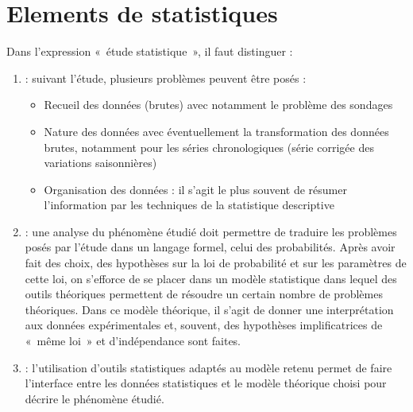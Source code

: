 \documentclass[letterpaper,10pt,french]{sphinxmanual}
\begin{document}
\chapter{Elements de statistiques}
\label{\detokenize{elemstats:elements-de-statistiques}}\label{\detokenize{elemstats::doc}}
\sphinxAtStartPar
Dans l’expression « étude statistique », il faut distinguer :
\begin{enumerate}
%
\item {} 
\sphinxAtStartPar
{} : suivant l’étude, plusieurs problèmes peuvent être posés :
\begin{itemize}
\item {} 
\sphinxAtStartPar
Recueil des données (brutes) avec notamment le problème des sondages

\item {} 
\sphinxAtStartPar
Nature des données avec éventuellement la transformation des données brutes, notamment pour les séries chronologiques (série corrigée des variations saisonnières)

\item {} 
\sphinxAtStartPar
Organisation des données : il s’agit le plus souvent de résumer l’information par les techniques de la statistique descriptive

\end{itemize}

\item {} 
\sphinxAtStartPar
{} : une analyse du phénomène étudié doit permettre de traduire les problèmes posés par l’étude dans un langage formel, celui des probabilités. Après avoir fait des choix, des hypothèses sur la loi de probabilité et sur les paramètres de cette loi, on s’efforce de se placer dans un modèle statistique dans lequel des outils théoriques permettent de résoudre un certain nombre de problèmes théoriques. Dans ce modèle théorique, il s’agit de donner une interprétation aux données expérimentales et, souvent, des hypothèses implificatrices de « même loi » et d’indépendance sont faites.

\item {} 
\sphinxAtStartPar
{} : l’utilisation d’outils statistiques adaptés au modèle retenu permet de faire l’interface entre les données statistiques et le modèle théorique choisi pour décrire le phénomène étudié.

\end{enumerate}
\end{document}
